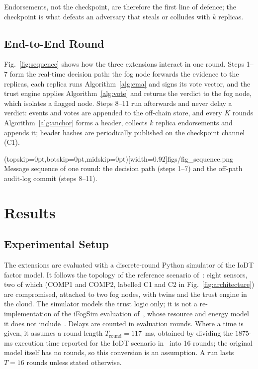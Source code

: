 \documentclass{ieeeaccess}
\begin{document}
Endorsements, not the checkpoint, are therefore the first line of
defence; the checkpoint is what defeats an adversary that steals or
colludes with $k$ replicas.

\subsection{End-to-End Round}
\label{sec:round}
Fig.~\ref{fig:sequence} shows how the three extensions interact in one
round.  Steps 1--7 form the real-time decision path: the fog node
forwards the evidence to the replicas, each replica runs
Algorithm~\ref{alg:ema} and signs its vote vector, and the trust engine
applies Algorithm~\ref{alg:vote} and returns the verdict to the fog
node, which isolates a flagged node.  Steps 8--11 run afterwards and
never delay a verdict: events and votes are appended to the off-chain
store, and every $K$ rounds Algorithm~\ref{alg:anchor} forms a header,
collects $k$ replica endorsements and appends it; header hashes are
periodically published on the checkpoint channel (C1).

\Figure[!t](topskip=0pt,botskip=0pt,midskip=0pt)[width=0.92\textwidth]{figs/fig_sequence.png}
{Message sequence of one round: the decision path (steps 1--7) and the off-path audit-log commit (steps 8--11).\label{fig:sequence}}

\section{Results}
\label{sec:resultsAndDiscussion}

\subsection{Experimental Setup}
\label{sec:setup}
The extensions are evaluated with a discrete-round Python simulator of
the IoDT factor model.  It follows the topology of the reference
scenario of~\cite{soula2024iodt}: eight sensors, two of which
(COMP1 and COMP2, labelled C1 and C2 in Fig.~\ref{fig:architecture}) are compromised, attached to two fog nodes, with
twins and the trust engine in the cloud.  The simulator models the
trust logic only; it is not a re-implementation of the iFogSim
evaluation of~\cite{soula2024iodt}, whose resource and energy model it
does not include~\cite{gupta2017ifogsim}.  Delays are counted in
evaluation rounds.  Where a time is given, it assumes a round length
$T_{\mathrm{round}}=117$~ms, obtained by dividing the $1875$-ms
execution time reported for the IoDT scenario in~\cite{soula2024iodt}
into 16 rounds; the
original model itself has no rounds, so this conversion is an
assumption.  A run lasts $T=16$ rounds unless stated otherwise.
\end{document}
